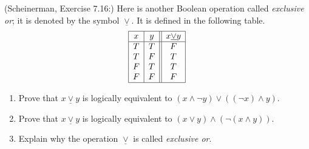 \documentclass{article}
\theoremstyle{definition}
\newcommand{\xor}{\underline{\lor}}
\begin{document}
\begin{question}
   (Scheinerman, Exercise 7.16:)
Here is another Boolean operation called \textit{exclusive or}; it is denoted by the symbol $\xor$. It is defined in the following table.
	\[\begin{array}{| c | c || c |}
	\hline
	x & y & x \xor y \\
	\hline
	T & T & F \\ 
	T & F & T \\
	F & T & T \\
	F & F & F \\
	\hline
	\end{array}\]
    \begin{enumerate}
        \item Prove that $x \xor y$ is logically equivalent to $(x \wedge \neg y) \vee ((\neg x) \wedge y)$.
        \item Prove that $x \xor y$ is logically equivalent to $(x \vee y) \wedge (\neg (x \wedge y))$.
        \item Explain why the operation $\xor$ is called \textit{exclusive or}.
    \end{enumerate}
\end{question}
\begin{solution}
\end{solution}
\end{document}
